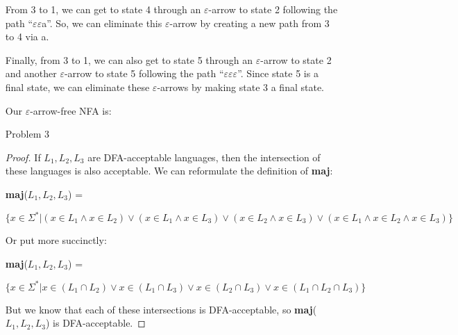 \documentclass[12pt,letterpaper]{article}
\begin{document}
\begin{enumerate}
      From 3 to 1, we can get to state 4 through an $\varepsilon$-arrow to state 2 following the path ``$\varepsilon\varepsilon$a''.
      So, we can eliminate this $\varepsilon$-arrow by creating a new path from 3 to 4 via a.

      Finally, from 3 to 1, we can also get to state 5 through an $\varepsilon$-arrow to state 2 and another $\varepsilon$-arrow to state 5 following the path ``$\varepsilon\varepsilon\varepsilon$''.
      Since state 5 is a final state, we can eliminate these $\varepsilon$-arrows by making state 3 a final state.

      Our $\varepsilon$-arrow-free NFA is:


    \item[Problem 3]
      \begin{proof}
        If $L_1,L_2,L_3$ are DFA-acceptable languages, then the intersection of these languages is also acceptable.
        We can reformulate the definition of \textbf{maj}:

        \textbf{maj}($L_1,L_2,L_3$) =

        $\{x \in \Sigma^* | (x \in L_1 \land x \in L_2) \lor (x \in L_1 \land x \in L_3) \lor (x \in L_2 \land x \in L_3) \lor (x \in L_1 \land x \in L_2 \land x \in L_3)\}$

        Or put more succinctly:

        \textbf{maj}($L_1,L_2,L_3$) =

        $\{x \in \Sigma^* | x \in (L_1 \cap L_2) \lor x \in (L_1 \cap L_3) \lor x \in (L_2 \cap L_3) \lor x \in (L_1 \cap L_2 \cap L_3)\}$

        But we know that each of these intersections is DFA-acceptable,
        so \textbf{maj}($L_1,L_2,L_3$) is DFA-acceptable.
      \end{proof}
  \end{enumerate}
\end{document}
